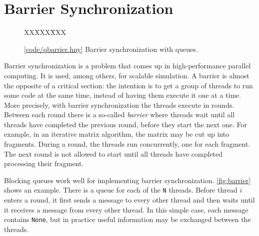 \documentclass{report}
\newcommand{\harmonysource}[1]{
\begin{tabbing}
XX\=XXX\=XXX\kill
    
\end{tabbing}
}
\newcommand{\harmonylink}[1]{%
[\href{https://harmony.cs.cornell.edu/#1}{\underline{#1}}]%
}
\newenvironment{code}{
\tcolorbox
}{
\endtcolorbox
}
\begin{document}
\chapter{Barrier Synchronization}
\label{ch:barrier}
%

%

\begin{figure}
\begin{code}
\harmonysource{qbarrier}
\end{code}
\caption{\harmonylink{code/qbarrier.hny} Barrier synchronization with queues.}
\label{fig:barrier}
\end{figure}

Barrier synchronization is a problem that comes up in high-performance
parallel computing.
It is used, among others, for scalable simulation.
A barrier is almost the opposite of a critical section:
the intention is to get a group of threads to run some code at the
same time, instead of having them execute it one at a time.
More precisely, with barrier synchronization the threads execute in rounds.
Between each round there is a so-called \emph{barrier} where threads wait
until all threads have completed the previous round, before they start the
next one.
For example, in an iterative matrix algorithm, the matrix may be
cut up into fragments.  During a round, the threads run concurrently,
one for each fragment.  The next round is not allowed to start
until all threads have completed processing their fragment.

Blocking queues work well for implementing barrier synchronization.
\autoref{fig:barrier} shows an example.  There is a queue
for each of the \texttt{N} threads.
Before thread $i$ enters a round, it first sends a message to every
other thread and then waits until it receives a message from
every other thread.
In this simple case, each message contains \texttt{None}, but in practice useful
information may be exchanged between the threads.
\end{document}
